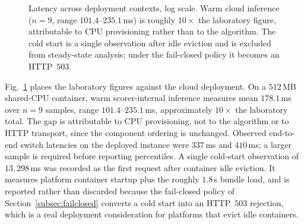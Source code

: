 \documentclass[conference]{IEEEtran}
\begin{document}
\begin{figure}[t]
\centering
{}
\caption{Latency across deployment contexts, log scale. Warm cloud
inference ($n=9$, range $101.4$--$235.1$\,ms) is roughly $10\times$ the
laboratory figure, attributable to CPU provisioning rather than to the
algorithm. The cold start is a single observation after idle eviction
and is excluded from steady-state analysis; under the fail-closed
policy it becomes an HTTP~$503$.}
\label{fig:latency}
\end{figure}

Fig.~\ref{fig:latency} places the laboratory figures against the cloud
deployment. On a $512$\,MB shared-CPU container, warm scorer-internal
inference measures mean $178.1$\,ms over $n=9$ samples, range
$101.4$--$235.1$\,ms, approximately $10\times$ the laboratory total.
The gap is attributable to CPU provisioning, not to the algorithm or to
HTTP transport, since the component ordering is unchanged. Observed
end-to-end switch latencies on the deployed instance were $337$\,ms and
$410$\,ms; a larger sample is required before reporting percentiles. A
single cold-start observation of $13{,}298$\,ms was recorded as the
first request after container idle eviction. It measures platform
container startup plus the roughly $1.8$\,s bundle load, and is
reported rather than discarded because the fail-closed policy of
Section~\ref{subsec:failclosed} converts a cold start into an HTTP~$503$
rejection, which is a real deployment consideration for platforms that
evict idle containers.
\end{document}
